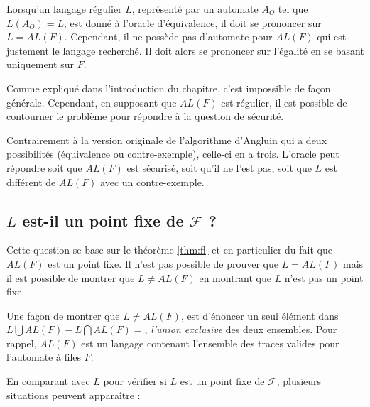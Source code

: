 Lorsqu'un langage régulier $L$, représenté par un automate $A_O$ tel que $L(A_O)=L$, est donné à l'oracle d'équivalence, il doit se prononcer sur $L=AL(F)$. Cependant, il ne possède pas d'automate pour $AL(F)$ qui est justement le langage recherché. Il doit alors se prononcer sur l'égalité en se basant uniquement sur $F$.

Comme expliqué dans l'introduction du chapitre, c'est impossible de façon générale. Cependant, en supposant que $AL(F)$ est régulier, il est possible de contourner le problème pour répondre à la question de sécurité.

Contrairement à la version originale de l'algorithme d'Angluin qui a deux possibilités (équivalence ou contre-exemple), celle-ci en a trois. L'oracle peut répondre soit que $AL(F)$ est sécurisé, soit qu'il ne l'est pas, soit que $L$ est différent de $AL(F)$ avec un contre-exemple.


\subsection{$L$ est-il un point fixe de $\mathcal{F}$ ?}\label{ss:fixe}

Cette question se base sur le théorème \ref{thm:fl} et en particulier du fait que $AL(F)$ est un point fixe. Il n'est pas possible de prouver que $L=AL(F)$ mais il est possible de montrer que $L\neq AL(F)$ en montrant que $L$ n'est pas un point fixe.

Une façon de montrer que $L\neq AL(F)$, est d'énoncer un seul élément dans $L\bigcup AL(F)-L\bigcap AL(F)=$\alfx, \emph{l'union exclusive} des deux ensembles. Pour rappel, $AL(F)$ est un langage contenant l'ensemble des traces valides pour l'automate à files $F$.

En comparant \fl avec $L$ pour vérifier si $L$ est un point fixe de $\mathcal{F}$, plusieurs situations peuvent apparaître :

